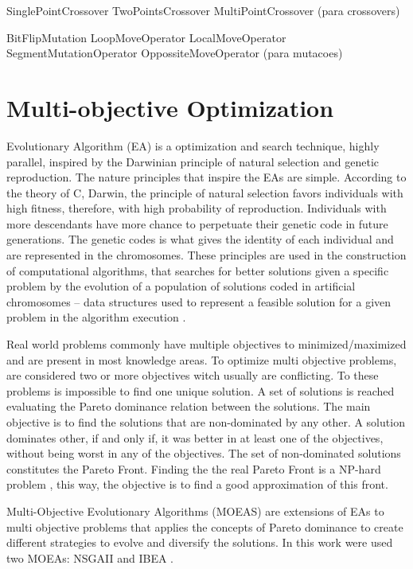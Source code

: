 



SinglePointCrossover
TwoPointsCrossover
MultiPointCrossover (para crossovers)

BitFlipMutation
LoopMoveOperator
LocalMoveOperator
SegmentMutationOperator
OppossiteMoveOperator (para mutacoes)


\section{Multi-objective Optimization} \label{sec:optimization}


Evolutionary Algorithm (EA) is a optimization and search technique, highly parallel, inspired by the Darwinian principle of natural selection and genetic reproduction. The nature principles that inspire the EAs are simple. According to the theory of C, Darwin, the principle of natural selection favors individuals with high fitness, therefore, with high probability of reproduction. Individuals with more descendants have more chance to perpetuate their genetic code in future generations. The genetic codes is what gives the identity of each individual and are represented in the chromosomes. These principles are used in the construction of computational algorithms, that searches for better solutions given a specific problem by the evolution of a population of solutions coded in artificial chromosomes -- data structures used to represent a feasible solution for a given problem in the algorithm execution \cite{pacheco1999algoritmos}.


Real world problems commonly have multiple objectives to minimized/maximized and are present in most knowledge areas. To optimize multi objective problems, are considered two or more objectives witch usually are conflicting. To these problems is impossible to find one unique solution. A set of solutions is reached evaluating the Pareto dominance relation \cite{pareto} between the solutions. The main objective is to find the solutions that are non-dominated by any other. A solution dominates other, if and only if, it was better in at least one of the objectives, without being worst in any of the objectives. The set of non-dominated solutions constitutes the Pareto Front. Finding the the real Pareto Front is a NP-hard problem \cite{fonseca2005tutorial}, this way, the objective is to find a good approximation of this front.


Multi-Objective Evolutionary Algorithms (MOEAS) are extensions of EAs to multi objective problems that applies the concepts of Pareto dominance to create different strategies to evolve and diversify the solutions. In this work were used two MOEAs: NSGAII \cite{deb2002fast} and IBEA \cite{zitzler2004indicator}.


